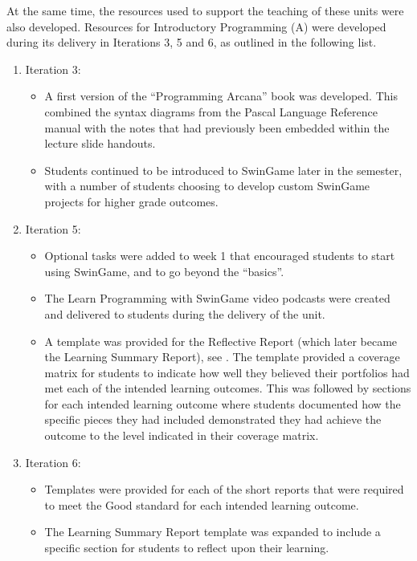 At the same time, the resources used to support the teaching of these units were also developed. Resources for Introductory Programming (A) were developed during its delivery in Iterations 3, 5 and 6, as outlined in the following list.
\begin{enumerate}
  \item Iteration 3:
  \begin{itemize}[noitemsep,nolistsep]
    \item A first version of the ``Programming Arcana'' book was developed. This combined the syntax diagrams from the Pascal Language Reference manual \cite{FPC:2013lang} with the notes that had previously been embedded within the lecture slide handouts.
    \item Students continued to be introduced to SwinGame later in the semester, with a number of students choosing to develop custom SwinGame projects for higher grade outcomes. 
  \end{itemize}
  \item Iteration 5:
  \begin{itemize}[noitemsep,nolistsep]
    \item Optional tasks were added to week 1 that encouraged students to start using SwinGame, and to go beyond the ``basics''.
    \item The Learn Programming with SwinGame video podcasts were created and delivered to students during the delivery of the unit.
    \item A template was provided for the Reflective Report (which later became the Learning Summary Report), see . The template provided a coverage matrix for students to indicate how well they believed their portfolios had met each of the intended learning outcomes. This was followed by sections for each intended learning outcome where students documented how the specific pieces they had included demonstrated they had achieve the outcome to the level indicated in their coverage matrix.
  \end{itemize}
  \item Iteration 6:
  \begin{itemize}[noitemsep,nolistsep]
    \item Templates were provided for each of the short reports that were required to meet the Good standard for each intended learning outcome.
    \item The Learning Summary Report template was expanded to include a specific section for students to reflect upon their learning.
  \end{itemize}
\end{enumerate}

